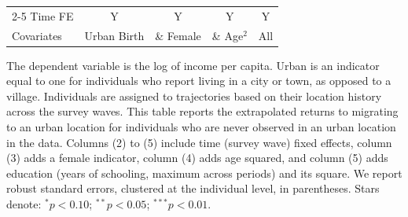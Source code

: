 \begin{table}[htbp]
\begin{threeparttable}
\begin{tabular}{l cccc}
\cmidrule{2-5} Time FE & Y & Y & Y & Y \\ Covariates & Urban Birth & \& Female & \& Age$^2$ & All \\ \bottomrule \end{tabular} \begin{tablenotes}[flushleft] \footnotesize \item{The dependent variable is the log of income per capita. Urban is an indicator equal to one for individuals who report living in a city or town, as opposed to a village. Individuals are assigned to trajectories based on their location history across the survey waves. This table reports the extrapolated returns to migrating to an urban location for individuals who are never observed in an urban location in the data. Columns (2) to (5) include time (survey wave) fixed effects, column (3) adds a female indicator, column (4) adds age squared, and column (5) adds education (years of schooling, maximum across periods) and its square. We report robust standard errors, clustered at the individual level, in parentheses. Stars denote: $^{*} p<0.10$; $^{**} p<0.05$; $^{***} p<0.01$.} \end{tablenotes} \end{threeparttable} \end{table}

